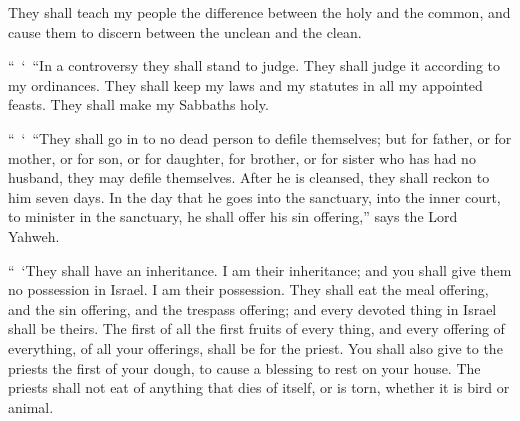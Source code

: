 {They shall teach my people the difference between the holy and the common, and cause them to discern between the unclean and the clean.
\par }{\PP {}“ ‘ “In a controversy they shall stand to judge. They shall judge it according to my ordinances. They shall keep my laws and my statutes in all my appointed feasts. They shall make my Sabbaths holy.
\par }{\PP {}“ ‘ “They shall go in to no dead person to defile themselves; but for father, or for mother, or for son, or for daughter, for brother, or for sister who has had no husband, they may defile themselves.
After he is cleansed, they shall reckon to him seven days.
In the day that he goes into the sanctuary, into the inner court, to minister in the sanctuary, he shall offer his sin offering,” says the Lord Yahweh.
\par }{\PP {}“ ‘They shall have an inheritance. I am their inheritance; and you shall give them no possession in Israel. I am their possession.
They shall eat the meal offering, and the sin offering, and the trespass offering; and every devoted thing in Israel shall be theirs.
The first of all the first fruits of every thing, and every offering of everything, of all your offerings, shall be for the priest. You shall also give to the priests the first of your dough, to cause a blessing to rest on your house.
The priests shall not eat of anything that dies of itself, or is torn, whether it is bird or animal.

}
